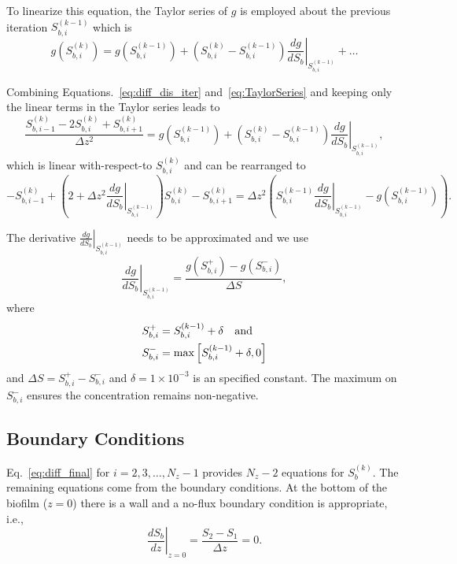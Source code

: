 \documentclass[letterpaper, twoside]{article}
\numberwithin{equation}{section}
\newcommand{\ie}{i.e.}
\begin{document}
To linearize this equation, the Taylor series of $g$ is employed about the previous iteration $S_{b,i}^{(k-1)}$ which is
\begin{equation}\label{eq:TaylorSeries}
  g\left(S_{b,i}^{(k)}\right) =   g\left(S_{b,i}^{(k-1)}\right) + \left( S_{b,i}^{(k)} - S_{b,i}^{(k-1)}\right) \left.\frac{d g}{d S_b}\right|_{S_{b,i}^{(k-1)}} + \dots
\end{equation}

Combining Equations.~\ref{eq:diff_dis_iter} and~\ref{eq:TaylorSeries} and keeping only the linear terms in the Taylor series leads to
\begin{equation} \label{eq:diff_linear}
  \frac{ S_{b,i-1}^{(k)} - 2 S_{b,i}^{(k)} + S_{b,i+1}^{(k)}}{\Delta z^2} =  g\left(S_{b,i}^{(k-1)}\right) + \left( S_{b,i}^{(k)} - S_{b,i}^{(k-1)}\right) \left.\frac{d g}{d S_b}\right|_{S_{b,i}^{(k-1)}},
\end{equation}
which is linear with-respect-to $S_{b,i}^{(k)}$ and can be rearranged to
\begin{equation}
  \label{eq:diff_final}
  -S_{b,i-1}^{(k)} + \left( 2 +\Delta z^2\left.\frac{d g}{d S_b}\right|_{S_{b,i}^{(k-1)}}\right) S_{b,i}^{(k)} - S_{b,i+1}^{(k)}
  = \Delta z^2\left( S_{b,i}^{(k-1)} \left.\frac{d g}{d S_b}\right|_{S_{b,i}^{(k-1)}} - g\left(S_{b,i}^{(k-1)}\right)\right) .
\end{equation}

The derivative $\left.\frac{d g}{d S_b}\right|_{S_{b,i}^{(k-1)}}$ needs to be approximated and we use
\begin{equation}
  \label{eq:dgds}
  \left.\frac{d g}{d S_b}\right|_{S_{b,i}^{(k-1)}} = \frac{g\left(S_{b,i}^+\right) - g\left(S_{b,i}^{-}\right)}{\Delta S},
\end{equation}
where
\begin{align*}
  S_{b,i}^+&=S_{b,i}^{(k-1)}+\delta \text{\quad and} \\
  S_{b,i}^-&=\max\left[S_{b,i}^{(k-1)}+\delta,0\right]
\end{align*}
and $\Delta S = S_{b,i}^+ - S_{b,i}^-$ and $\delta=1\times 10^{-3}$ is an specified constant.  The maximum on $S_{b,i}^-$ ensures the concentration remains non-negative.

\subsection{Boundary Conditions} \label{Boundary Conditions}
Eq.~\ref{eq:diff_final} for $i=2,3,\dots,N_z-1$ provides $N_z-2$ equations for $S_{b}^{(k)}$.  The remaining equations come from the boundary conditions.  At the bottom of the biofilm ($z=0$) there is a wall and a no-flux boundary condition is appropriate, \ie,
\begin{equation}
  \label{eq:BC1}
  \left.\frac{d S_b}{dz}\right|_{z=0}= \frac{S_2 - S_1}{\Delta z} =0.
\end{equation}
\end{document}
